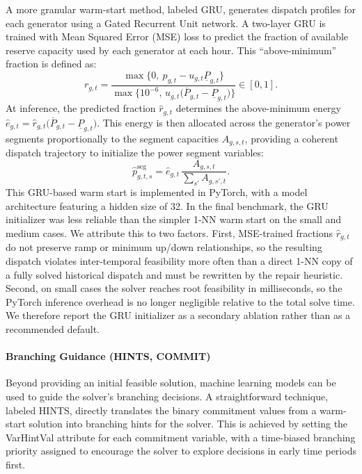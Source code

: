 \documentclass[runningheads]{llncs}
\begin{document}
A more granular warm-start method, labeled GRU, generates dispatch profiles for each generator using a Gated Recurrent Unit network. A two-layer GRU is trained with Mean Squared Error (MSE) loss to predict the fraction of available reserve capacity used by each generator at each hour. This ``above-minimum'' fraction is defined as:
\begin{equation}
r_{g,t}=\frac{\max\{0,\ p_{g,t}-u_{g,t}\underline{P}_{g,t}\}}{\max\{10^{-6},\,u_{g,t}\big(\overline{P}_{g,t}-\underline{P}_{g,t}\big)\}}\in[0,1].
\end{equation}
At inference, the predicted fraction $\hat r_{g,t}$ determines the above-minimum energy $\hat e_{g,t}=\hat r_{g,t}\big(\overline{P}_{g,t}-\underline{P}_{g,t}\big)$. This energy is then allocated across the generator's power segments proportionally to the segment capacities $A_{g,s,t}$, providing a coherent dispatch trajectory to initialize the power segment variables:
\begin{equation}
\hat p^{\mathrm{seg}}_{g,t,s}=\hat e_{g,t}\,\frac{A_{g,s,t}}{\sum_{s'}A_{g,s',t}}.
\end{equation}
This GRU-based warm start is implemented in PyTorch, with a model architecture featuring a hidden size of 32. In the final benchmark, the GRU initializer was less reliable than the simpler 1-NN warm start on the small and medium cases. We attribute this to two factors. First, MSE-trained fractions $\hat r_{g,t}$ do not preserve ramp or minimum up/down relationships, so the resulting dispatch violates inter-temporal feasibility more often than a direct 1-NN copy of a fully solved historical dispatch and must be rewritten by the repair heuristic. Second, on small cases the solver reaches root feasibility in milliseconds, so the PyTorch inference overhead is no longer negligible relative to the total solve time. We therefore report the GRU initializer as a secondary ablation rather than as a recommended default.


\paragraph{Branching Guidance (HINTS, COMMIT)}
Beyond providing an initial feasible solution, machine learning models can be used to guide the solver's branching decisions. A straightforward technique, labeled HINTS, directly translates the binary commitment values from a warm-start solution into branching hints for the solver. This is achieved by setting the VarHintVal attribute for each commitment variable, with a time-biased branching priority assigned to encourage the solver to explore decisions in early time periods first.
\end{document}
